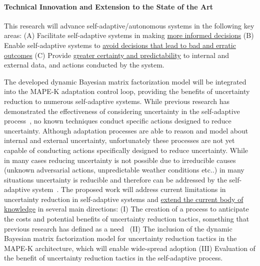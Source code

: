 \documentclass[12pt]{article}
\begin{document}
\vspace{-0mm}\paragraph{Technical Innovation and Extension to the State of the Art}
This research will advance self-adaptive/autonomous systems in the following key areas: (A) Facilitate self-adaptive systems in making \ul{more informed decisions} (B) Enable self-adaptive systems to \ul{avoid decisions that lead to bad and erratic outcomes} (C) Provide \ul{greater certainty and predictability} to internal and external data, and actions conducted by the system.

The developed dynamic Bayesian matrix factorization model will be integrated into the MAPE-K adaptation control loop, providing the benefits of uncertainty reduction to numerous self-adaptive systems. While previous research has demonstrated the effectiveness of considering uncertainty in the self-adaptive process~\cite{calinescu2011dynamic, camara2017reasoning, esfahani2013uncertainty}, no known techniques conduct specific actions designed to reduce uncertainty. Although adaptation processes are able to reason and model about internal and external uncertainty, unfortunately these processes are not yet capable of conducting actions specifically designed to reduce uncertainty. While in many cases reducing uncertainty is not possible due to irreducible causes (unknown adversarial actions, unpredictable weather conditions etc..) in many situations uncertainty is reducible and therefore can be addressed by the self-adaptive system~\cite{moreno2018uncertainty}. The proposed work will address current limitations in uncertainty reduction in self-adaptive systems and \ul{extend the current body of knowledge} in several main directions: (I) The creation of a process to anticipate the costs and potential benefits of uncertainty reduction tactics, something that previous research has defined as a need~\cite{moreno2018uncertainty} (II) The inclusion of the dynamic Bayesian matrix factorization model for uncertainty reduction tactics in the MAPE-K architecture, which will enable wide-spread adoption (III) Evaluation of the benefit of uncertainty reduction tactics in the self-adaptive process.

\end{document}
